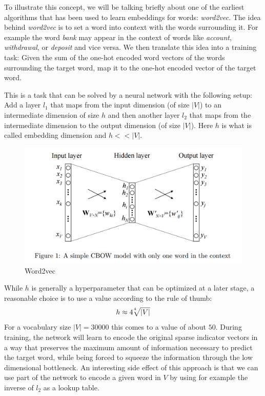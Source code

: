 To illustrate this concept, we will be talking briefly about one of the earliest algorithms that has been used to learn embeddings for words: \textit{word2vec}. The idea behind \textit{word2vec} is to set a word into context with the words surrounding it.
For example the word \textit{bank} may appear in the context of words like \textit{account}, \textit{withdrawal}, or \textit{deposit} and vice versa.
We then translate this idea into a training task:
Given the sum of the one-hot encoded word vectors of the words surrounding the target word, map it to the one-hot encoded vector of the target word.

This is a task that can be solved by a neural network with the following setup:
Add a layer $l_1$ that maps from the input dimension (of size $|V|$) to an intermediate dimension of size $h$ and then another layer $l_2$ that maps from the intermediate dimension to the output dimension (of size $|V|$).
Here $h$ is what is called embedding dimension and $h << |V|$.
\begin{figure}
  \includegraphics[width=\linewidth]{chapters/NLP/figures/word2vec.png}
  \caption{Word2vec}
  \label{fig:word2vec}
\end{figure}
While $h$ is generally a hyperparameter that can be optimized at a later stage, a reasonable choice is to use a value according to the rule of thumb:
\begin{equation}
  h \approx 4\sqrt[\leftroot{3} \uproot{3} 4]{|V|}
\end{equation}
For a vocabulary size $|V| = 30000$ this comes to a value of about $50$.
During training, the network will learn to encode the original sparse indicator vectors in a way that preserves the maximum amount of information necessary to predict the target word, while being forced to squeeze the information through the low dimensional bottleneck.
An interesting side effect of this approach is that we can use part of the network to encode a given word in $V$ by using for example the inverse of $l_2$ as a lookup table.
